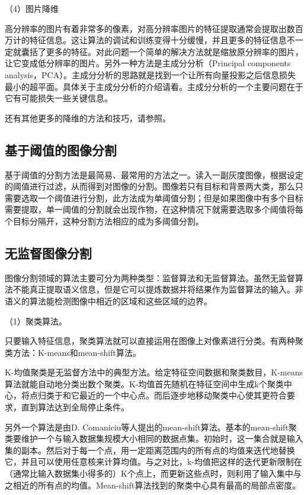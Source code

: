 \documentclass{article}
\begin{document}
（4）图片降维

高分辨率的图片有着非常多的像素，对高分辨率图片的特征提取通常会提取出数百万计的特征信息。这让算法的调试和训练变得十分缓慢，并且更多的特征信息不一定就囊括了更多的特征。对此问题一个简单的解决方法就是缩放原分辨率的图片，让它变成低分辨率的图片。另外一种方法是主成分分析（Principal components analysis，PCA）。主成分分析的思路就是找到一个让所有向量投影之后信息损失最小的超平面。具体关于主成分分析的介绍请看\citep{shlens2014tutorial}。主成分分析的一个主要问题在于它有可能损失一些关键信息。

还有其他更多的降维的方法和技巧，请参照\citep{Maaten08dimensionalityreduction}。
\subsection{基于阈值的图像分割}
基于阈值的分割方法是最简易、最常用的方法之一。读入一副灰度图像，根据设定的阈值进行过滤，从而得到对图像的分割。图像若只有目标和背景两大类，那么只需要选取一个阈值进行分割，此方法成为单阈值分割；但是如果图像中有多个目标需要提取，单一阈值的分割就会出现作物，在这种情况下就需要选取多个阈值将每个目标分隔开，这种分割方法相应的成为多阈值分割。

\subsection{无监督图像分割}
图像分割领域的算法主要可分为两种类型：监督算法和无监督算法。虽然无监督算法不能真正提取语义信息，但是它可以提炼数据并将结果作为监督算法的输入。非语义的算法能检测图像中相近的区域和这些区域的边界。

（1）聚类算法。

只要输入特征信息，聚类算法就可以直接运用在图像上对像素进行分类。有两种聚类方法：K-means和mean-shift算法。

K-均值聚类是无监督方法中的典型方法。给定特征空间数据和聚类数目，K-means算法就能自动地分类出数个聚类。K-均值首先随机在特征空间中生成k个聚类中心，将点归类于和它最近的一个中心点。而后逐步地移动聚类中心使其更符合要求，直到算法达到全局停止条件。

另外一个算法是由D. Comaniciu等人提出的mean-shift算法\citep{1000236}。基本的mean-shift聚类要维护一个与输入数据集规模大小相同的数据点集。初始时，这一集合就是输入集的副本。然后对于每一个点，用一定距离范围内的所有点的均值来迭代地替换它，并且可以使用任意核来计算均值。与之对比，k-均值把这样的迭代更新限制在（通常比输入数据集小得多的）K个点上，而更新这些点时，则利用了输入集中与之相近的所有点的均值。Mean-shift算法找到的聚类中心具有最高的局部点密度。
\end{document}
